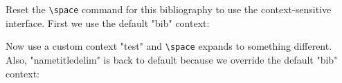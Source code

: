 \documentclass[a4paper]{article}
\newcommand{\cmd}[1]{\texttt{\textbackslash #1}}
\begin{document}
Reset the \cmd{space} command for this bibliography to use the
context-sensitive interface. First we use the default "bib" context:
\printbibliography

Now use a custom context "test" and \cmd{space} expands to something
different. Also, "nametitledelim" is back to default because we override
the default "bib" context:
\printbibliography
\end{document}
